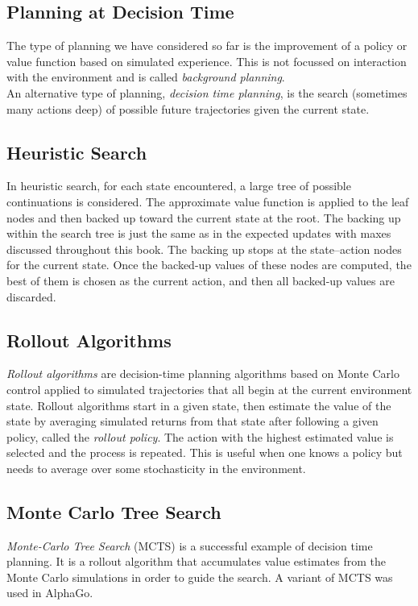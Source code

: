 \subsection{Planning at Decision Time}
The type of planning we have considered so far is the improvement of a policy or value function based on simulated experience. This is not focussed on interaction with the environment and is called \emph{background planning}.\\

An alternative type of planning, \emph{decision time planning}, is the search (sometimes many actions deep) of possible future trajectories given the current state.\\


\subsection{Heuristic Search}
In heuristic search, for each state encountered, a large tree of possible continuations is considered. The approximate value function is applied to the leaf nodes and then backed up toward the current state at the root. The backing up within the search tree is just the same as in the expected updates with maxes discussed throughout this book. The backing up stops at the state–action nodes for the current state. Once the backed-up values of these nodes are computed, the best of them is chosen as the current action, and then all backed-up values are discarded.\\


\subsection{Rollout Algorithms}
\emph{Rollout algorithms} are decision-time planning algorithms based on Monte Carlo control applied to simulated trajectories that all begin at the current environment state. Rollout algorithms start in a given state, then estimate the value of the state by averaging simulated returns from that state after following a given policy, called the \emph{rollout policy}. The action with the highest estimated value is selected and the process is repeated. This is useful when one knows a policy but needs to average over some stochasticity in the environment. \\

\subsection{Monte Carlo Tree Search}
\emph{Monte-Carlo Tree Search} (MCTS) is a successful example of decision time planning. It is a rollout algorithm that accumulates value estimates from the Monte Carlo simulations in order to guide the search. A variant of MCTS was used in AlphaGo.\\

